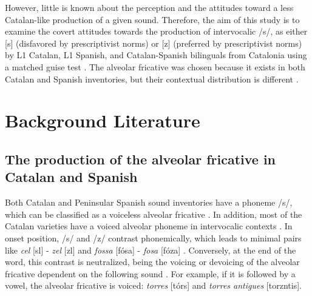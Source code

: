 \documentclass[
  a4paper,
  11pt,
  twocolumn]{article}
\begin{document}
However, little is known about the perception and the attitudes toward a
less Catalan-like production of a given sound. Therefore, the aim of
this study is to examine the covert attitudes towards the production of
intervocalic /s/, as either {[}s{]} (disfavored by prescriptivist norms)
or {[}z{]} (preferred by prescriptivist norms) by L1 Catalan, L1
Spanish, and Catalan-Spanish bilinguals from Catalonia using a matched
guise test \cite{lambert_1967}. The alveolar fricative was chosen
because it exists in both Catalan and Spanish inventories, but their
contextual distribution is different \cite{llisterri_2023}.

\section{Background Literature}

\subsection{The production of the alveolar fricative in Catalan and Spanish}

Both Catalan and Peninsular Spanish sound inventories have a phoneme
/s/, which can be classified as a voiceless alveolar fricative
\cite{hualde_2015}. In addition, most of the Catalan varieties have a
voiced alveolar phoneme in intervocalic contexts \cite{lloret_2011}
\cite{recasens_1996}. In onset position, /s/ and /z/ contrast
phonemically, which leads to minimal pairs like \emph{cel}
{[}s\textepsilon l{]} - \emph{zel} {[}z\textepsilon l{]} and
\emph{fossa} {[}fósa{]} - \emph{fosa} {[}fóza{]}
\cite{carrera_sabate_prieto_2012_2019}. Conversely, at the end of the
word, this contrast is neutralized, being the voicing or devoicing of
the alveolar fricative dependent on the following sound \cite{iec_2022}.
For example, if it is followed by a vowel, the alveolar fricative is
voiced: \emph{torres} {[}tór\textschwa{}s{]} and \emph{torres antigues}
{[}tor\textschwa{}z\textschwa{}nti\textgamma{}\textschwa{}s{]}.
\end{document}
